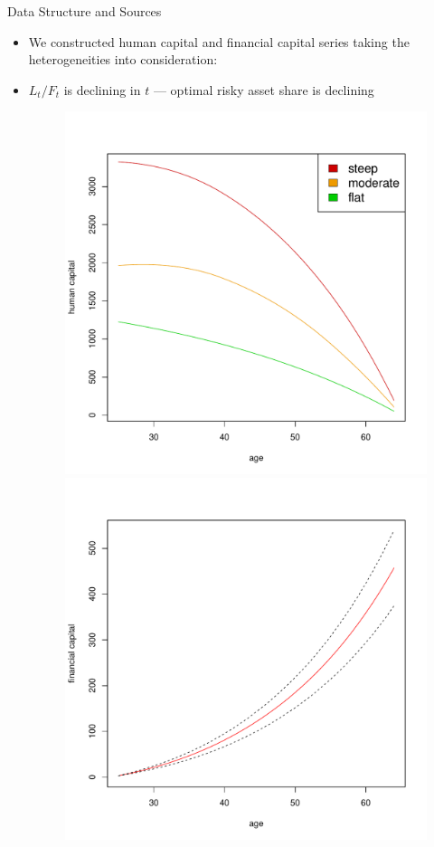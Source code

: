 \documentclass{beamer}
\begin{document}
\begin{frame}[allowframebreaks]{Data Structure and Sources}
\begin{itemize}
\framebreak

	\item We constructed human capital and financial capital series taking the heterogeneities into consideration:
	\item $L_t/F_t$ is declining in $t$ --- optimal risky asset share is declining

\begin{figure}[h]
		\includegraphics[scale=0.25]{figs/humancapital.pdf}
		\includegraphics[scale=0.25]{figs/fincapital.pdf}
\end{figure}


\end{itemize}
\end{frame}
\end{document}
